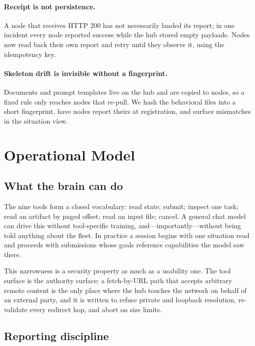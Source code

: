\documentclass{article}
\begin{document}
\paragraph{Receipt is not persistence.} A node that receives HTTP 200 has not
necessarily landed its report; in one incident every node reported success while the
hub stored empty payloads. Nodes now read back their own report and retry until they
observe it, using the idempotency key.

\paragraph{Skeleton drift is invisible without a fingerprint.} Documents and prompt
templates live on the hub and are copied to nodes, so a fixed rule only reaches
nodes that re-pull. We hash the behavioral files into a short fingerprint, have nodes
report theirs at registration, and surface mismatches in the situation view.

\section{Operational Model}
\label{sec:model}

\subsection{What the brain can do}

The nine tools form a closed vocabulary: read state; submit; inspect one task; read an
artifact by paged offset; read an input file; cancel. A general chat model can drive
this without tool-specific training, and---importantly---without being told anything
about the fleet. In practice a session begins with one situation read and proceeds
with submissions whose goals reference capabilities the model saw there.

This narrowness is a security property as much as a usability one. The tool surface
is the authority surface; a fetch-by-URL path that accepts arbitrary remote content
is the only place where the hub touches the network on behalf of an external party,
and it is written to refuse private and loopback resolution, re-validate every
redirect hop, and abort on size limits.

\subsection{Reporting discipline}
\end{document}
